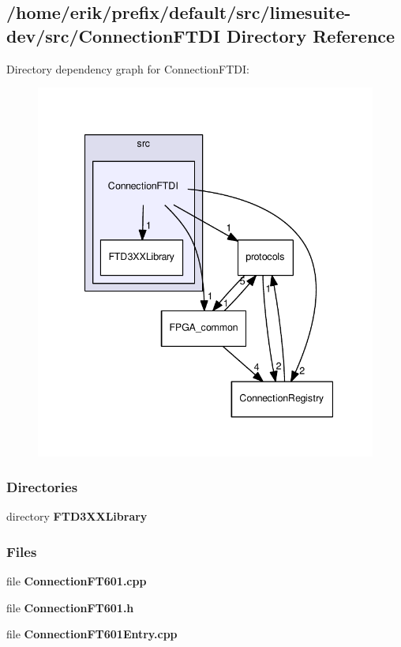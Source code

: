 \subsection{/home/erik/prefix/default/src/limesuite-\/dev/src/\+Connection\+F\+T\+DI Directory Reference}
\label{dir_cbf1d917e6b0b47cfeacbe4814605562}
Directory dependency graph for Connection\+F\+T\+DI\+:
\nopagebreak
\begin{figure}[H]
\begin{center}
\leavevmode
\includegraphics[width=341pt]{dir_cbf1d917e6b0b47cfeacbe4814605562_dep}
\end{center}
\end{figure}
\subsubsection*{Directories}
\begin{DoxyCompactItemize}
\item 
directory {\bf F\+T\+D3\+X\+X\+Library}
\end{DoxyCompactItemize}
\subsubsection*{Files}
\begin{DoxyCompactItemize}
\item 
file {\bf Connection\+F\+T601.\+cpp}
\item 
file {\bf Connection\+F\+T601.\+h}
\item 
file {\bf Connection\+F\+T601\+Entry.\+cpp}
\end{DoxyCompactItemize}
